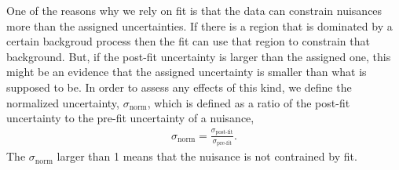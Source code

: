 One of the reasons why we rely on fit is that the data can constrain nuisances 
more than the assigned uncertainties. If there is a region that is dominated by 
a certain backgroud process then the fit can use that region to constrain that 
background. But, if the post-fit uncertainty is larger than the assigned one, 
this might be an evidence that the assigned uncertainty is smaller than what is 
supposed to be. In order to assess any effects of this kind, we define the 
normalized uncertainty, $\sigma_{\textrm{norm}}$, which is defined as a 
ratio of the post-fit uncertainty to the pre-fit uncertainty of a nuisance, 
\begin{eqnarray} 
\sigma_{\textrm{norm}} = \frac{\sigma_{\textrm{post-fit}}}{\sigma_{\textrm{pre-fit}}}. 
\end{eqnarray} 
The $\sigma_{\textrm{norm}}$ larger than 1 means that the nuisance is not contrained by 
fit.


